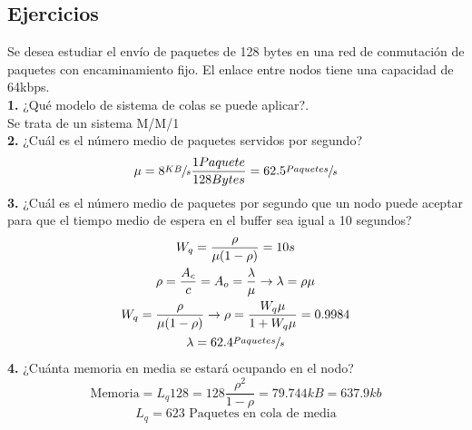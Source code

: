 \subsection{Ejercicios}
\begin{exercise}[1]
Se desea estudiar el envío de paquetes de 128 bytes en una red de conmutación de paquetes con encaminamiento fijo. El enlace entre nodos tiene una capacidad de 64kbps.\\
\textbf{1.} ¿Qué modelo de sistema de colas se puede aplicar?.\\
Se trata de un sistema M/M/1\\
\textbf{2.} ¿Cuál es el número medio de paquetes servidos por segundo?\\
\[\mu=8\sfrac{KB}{s}\frac{1Paquete}{128Bytes}=62.5\sfrac{Paquetes}{s}\]
\textbf{3.} ¿Cuál es el número medio de paquetes por segundo que un nodo puede aceptar para que el tiempo medio de espera en el buffer sea igual a 10 segundos?\\
\begin{gather*}
W_q=\frac{\rho}{\mu(1-\rho)}=10s\\
\rho=\frac{A_c}{c}=A_o=\frac{\lambda}{\mu}\to \lambda=\rho \mu\\
W_q=\frac{\rho}{\mu(1-\rho)}\to\rho=\frac{W_q \mu}{1+W_q\mu}=0.9984\\
\lambda=62.4\sfrac{Paquetes}{s}
\end{gather*}
\textbf{4.} ¿Cuánta memoria en media se estará ocupando en el nodo?\\
\[\text{Memoria}=L_q128=128\frac{\rho^2}{1-\rho}=79.744kB=637.9kb\]
\[L_q=623 \text{ Paquetes en cola de media}\]
\end{exercise}
